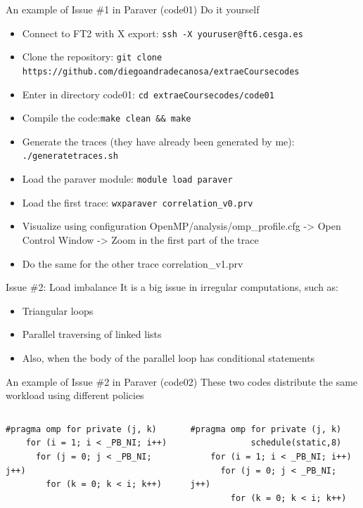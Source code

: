 \documentclass[10pt,xcolor=table]{beamer}
\begin{document}
\begin{frame}{An example of Issue \#1 in Paraver (code01)}
Do it yourself
\begin{itemize}
    \item Connect to FT2 with X export: {\tt ssh -X youruser@ft6.cesga.es}
    \item Clone the repository: {\tt git clone https://github.com/diegoandradecanosa/extraeCoursecodes}
    \item Enter in directory code01: {\tt cd extraeCoursecodes/code01}
    \item Compile the code:{\tt make clean \&\& make}
    \item Generate the traces (they have already been generated by me): {\tt ./generatetraces.sh}
    \item Load the paraver module:  {\tt module load paraver}
    \item Load the first trace: {\tt wxparaver correlation\_v0.prv}
    \item Visualize using configuration OpenMP/analysis/omp\_profile.cfg -> Open Control Window -> Zoom in the first part of the trace
    \item Do the same for the other trace correlation\_v1.prv
\end{itemize}
\end{frame}

\begin{frame}{Issue \#2: Load imbalance}
It is a big issue in irregular computations, such as:
\begin{itemize}
    \item Triangular loops
    \item Parallel traversing of linked lists
    \item Also, when the body of the parallel loop has conditional statements
\end{itemize}
\end{frame}

\begin{frame}[fragile]{An example of Issue \#2 in Paraver (code02)}
These two codes distribute the same workload using different policies
\begin{columns}
\begin{column}{0.5\textwidth}
\begin{lstlisting}[style=shell,basicstyle=\scriptsize\ttfamily,gobble=3,caption={Default scheduling}]
    #pragma omp for private (j, k)
    for (i = 1; i < _PB_NI; i++)
      for (j = 0; j < _PB_NI; j++)
        for (k = 0; k < i; k++)
  \end{lstlisting}
  \end{column}
\begin{column}{0.5\textwidth}
  \begin{lstlisting}[style=shell,gobble=3,basicstyle=\scriptsize\ttfamily,caption={Load-balance-aware scheduling}]
    #pragma omp for private (j, k) 
            schedule(static,8)
    for (i = 1; i < _PB_NI; i++)
      for (j = 0; j < _PB_NI; j++)
	    for (k = 0; k < i; k++)
  \end{lstlisting}
  \end{column}
  \end{columns}
\end{frame}
\end{document}

